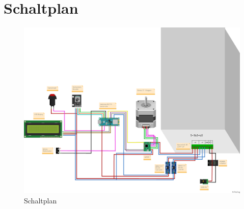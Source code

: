 \section{Schaltplan}
\begin{figure}[htb]
\begin{center}
	\includegraphics[width=\textwidth]{Images/Schaltplan1.png}
	\caption{Schaltplan} \label{Schaltplan}
\end{center}
\end{figure}

